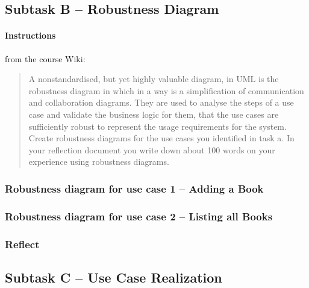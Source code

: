 \subsection{Subtask B -- Robustness Diagram}\label{task-1b}
\paragraph{Instructions}\label{task-1b-instructions}
from the course Wiki\cite{1dv600:lab2:instructions}:

\begin{quote}
  A non­standardised, but yet highly valuable diagram, in UML is the robustness
  diagram in which in a way is a simplification of communication and
  collaboration diagrams. They are used to analyse the steps of a use case and
  validate the business logic for them, that the use cases are sufficiently
  robust to represent the usage requirements for the system.  Create robustness
  diagrams for the use cases you identified in task a. In your reflection
  document you write down about 100 words on your experience using robustness
  diagrams.
\end{quote}


\subsubsection{Robustness diagram for use case 1 -- Adding a Book}\label{task-1b-robust1}
%


\subsubsection{Robustness diagram for use case 2 -- Listing all Books}\label{task-1b-robust2}
%


\subsubsection{Reflect}\label{task-1b-reflect}
%



\subsection{Subtask C -- Use Case Realization}\label{task-1c}
